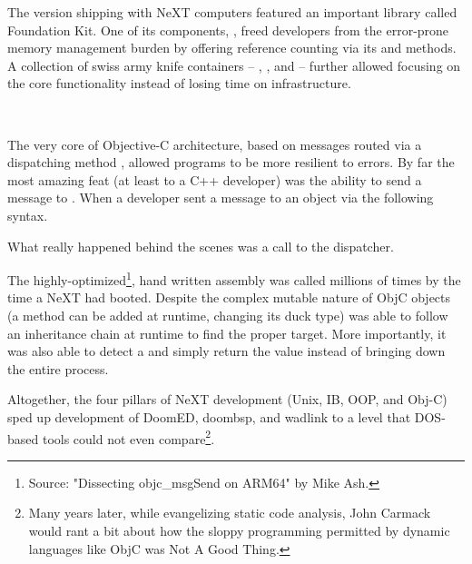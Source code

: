 \par
\vspace{-5pt}
The version shipping with NeXT computers featured an important library called Foundation Kit. One of its components, , freed developers from the error-prone memory management burden by offering reference counting via its  and  methods. A collection of swiss army knife containers -- , ,  and  -- further allowed focusing on the core functionality instead of losing time on infrastructure.\\
\par
{}\\
\par
The very core of Objective-C architecture, based on messages routed via a dispatching method , allowed programs to be more resilient to errors. By far the most amazing feat (at least to a C++ developer) was the ability to send a message to . When a developer sent a message to an object via the following syntax.\\ \par
{}
What really happened behind the scenes was a call to the dispatcher.\\
\par
{}
The highly-optimized\footnote{Source: "Dissecting objc\_msgSend on ARM64" by Mike Ash.}, hand written assembly was called millions of times by the time a NeXT had booted. Despite the complex mutable nature of ObjC objects (a method can be added at runtime, changing its duck type)  was able to follow an inheritance chain at runtime to find the proper target. More importantly, it was also able to detect a  and simply return the value  instead of bringing down the entire process.\\
\par

Altogether, the four pillars of NeXT development (Unix, IB, OOP, and Obj-C) sped up development of DoomED, doombsp, and wadlink to a level that DOS-based tools could not even compare\footnote{Many years later, while evangelizing static code analysis, John Carmack would rant a bit about how the sloppy programming permitted by dynamic languages like ObjC was Not A Good Thing.}.

